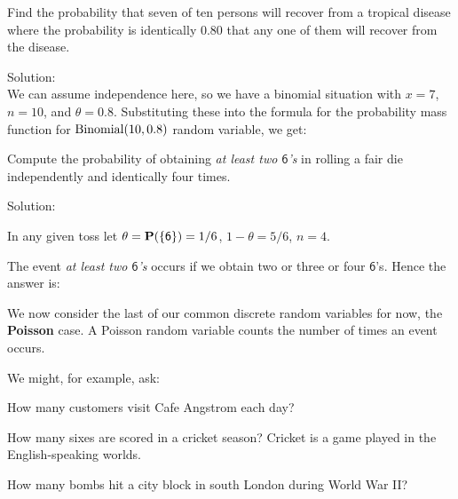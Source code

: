 \begin{example}\label{Eg:70f10recover}
Find the probability that seven of ten persons will recover from a
  tropical disease where the probability is
  identically $0.80$ that any one of them will recover from the
  disease.

{Solution:}\\[4pt]
We can assume independence here, so we have a binomial
situation with  $x=7$, $n=10$, and $\theta=0.8$. Substituting these into the formula for the probability mass function for $\mbox{{\rm Binomial}}(10,0.8)$ random variable, we get:
\end{example}

\begin{example}\label{Eg:alteast2_6s}
{Compute the probability of obtaining {\em at least two
    $\mathsf{6}$'s} in rolling a fair die independently and identically
  four times.}

{Solution:}\\[4pt]
{In any given toss let $\theta=\mathbf{P}(\{\mathsf{6}\})=1/6$,
$1-\theta=5/6$, $n=4$.

The event {\em at least two $\mathsf{6}$'s} occurs if we obtain two or
three or four $\mathsf{6}$'s.  Hence the answer is:
}
\end{example}

We now consider the last of our common discrete random variables for now, the {\bf Poisson} case.  
A Poisson random variable counts the number of times an event occurs.

We might, for example, ask:
\bit
\item How many customers visit Cafe Angstrom each day?
\item How many sixes  are scored  in a cricket season? {\scriptsize Cricket is a game played in the English-speaking worlds.}
\item How many bombs hit a city block in south London during World War II?
\eit


